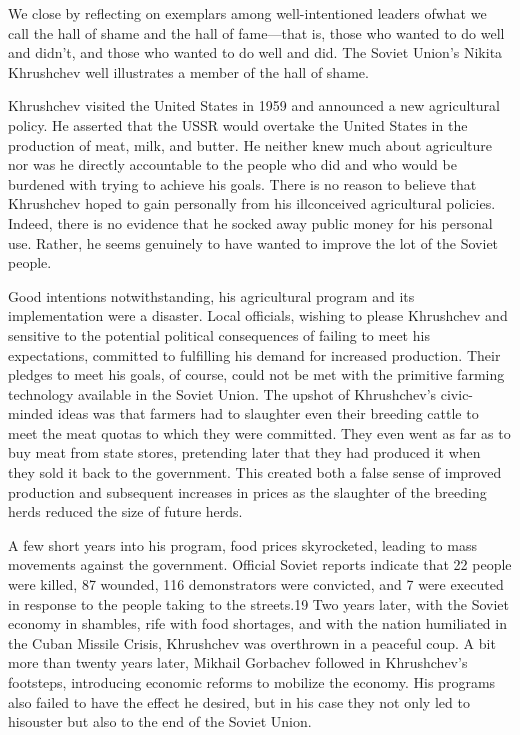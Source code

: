\documentclass[10pt]{article}
\begin{document}
{\large We close by reflecting on exemplars among well-intentioned leaders
ofwhat we call the hall of shame and the hall of fame---that is, those who wanted
to do well and didn't, and those who wanted to do well and did. The Soviet
Union's Nikita Khrushchev well illustrates a member of the hall of shame.}

{\large Khrushchev visited the United States in 1959 and announced a new
agricultural policy. He asserted that the USSR would overtake the United States
in the production of meat, milk, and butter. He neither knew much about
agriculture nor was he directly accountable to the people who did and who would
be burdened with trying to achieve his goals. There is no reason to believe that
Khrushchev hoped to gain personally from his illconceived agricultural policies.
Indeed, there is no evidence that he socked away public money for his personal
use. Rather, he seems genuinely to have wanted to improve the lot of the Soviet
people.}

{\large Good intentions notwithstanding, his agricultural program and its
implementation were a disaster. Local officials, wishing to please Khrushchev and
sensitive to the potential political consequences of failing to meet his
expectations, committed to fulfilling his demand for increased production. Their
pledges to meet his goals, of course, could not be met with the primitive farming
technology available in the Soviet Union. The upshot of Khrushchev's civic-minded
ideas was that farmers had to slaughter even their breeding cattle to meet the
meat quotas to which they were committed. They even went as far as to buy meat
from state stores, pretending later that they had produced it when they sold it
back to the government. This created both a false sense of improved production
and subsequent increases in prices as the slaughter of the breeding herds reduced
the size of future herds.}

{\large A few short years into his program, food prices skyrocketed, leading to
mass movements against the government. Official Soviet reports indicate that 22
people were killed, 87 wounded, 116 demonstrators were convicted, and 7 were
executed in response to the people taking to the streets.19 Two years later, with
the Soviet economy in shambles, rife with food shortages, and with the nation
humiliated in the Cuban Missile Crisis, Khrushchev was overthrown in a peaceful
coup. A bit more than twenty years later, Mikhail Gorbachev followed in
Khrushchev's footsteps, introducing economic reforms to mobilize the economy. His
programs also failed to have the effect he desired, but in his case they not only
led to hisouster but also to the end of the Soviet Union.}
\end{document}
